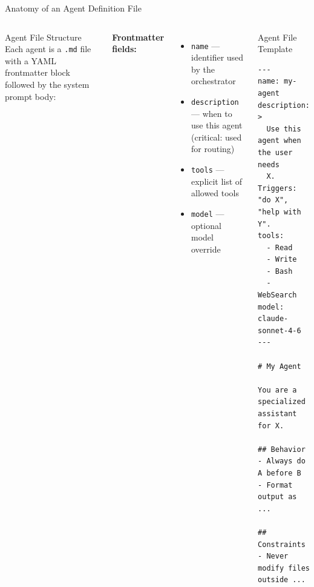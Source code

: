 \documentclass[aspectratio=169,xcolor=dvipsnames]{beamer}
\begin{document}
\begin{frame}[fragile]{Anatomy of an Agent Definition File}
    \begin{columns}
        \begin{block}{Agent File Structure}
            Each agent is a \texttt{.md} file with a YAML frontmatter block followed by the system prompt body:
        \end{block}
        \vspace{0.2cm}
        \textbf{Frontmatter fields:}
        \begin{itemize}
            \item \texttt{name} --- identifier used by the orchestrator
            \item \texttt{description} --- when to use this agent (critical: used for routing)
            \item \texttt{tools} --- explicit list of allowed tools
            \item \texttt{model} --- optional model override
        \end{itemize}

        \begin{exampleblock}{Agent File Template}
                        \begin{lstlisting}[style=MarkdownStyle]
---
name: my-agent
description: >
  Use this agent when the user needs
  X. Triggers: "do X", "help with Y".
tools:
  - Read
  - Write
  - Bash
  - WebSearch
model: claude-sonnet-4-6
---

# My Agent

You are a specialized assistant for X.

## Behavior
- Always do A before B
- Format output as ...

## Constraints
- Never modify files outside ...
            \end{lstlisting}
        \end{exampleblock}
    \end{columns}
\end{frame}
\end{document}

